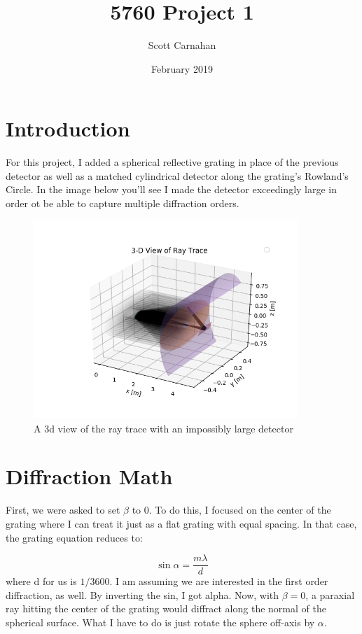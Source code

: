 \documentclass{article}
\title{5760 Project 1}
\author{Scott Carnahan}
\date{February 2019}
\begin{document}
\maketitle
\tableofcontents

\section{Introduction}
For this project, I added a spherical reflective grating in place of the previous detector as well as a matched cylindrical detector along the grating's Rowland's Circle.  In the image below you'll see I made the detector exceedingly large in order ot be able to capture multiple diffraction orders.

\begin{figure}[H]
    \centering
    \includegraphics[width=10cm]{figures/lab_view.png}
    \caption{A 3d view of the ray trace with an impossibly large detector}
    \label{}



\end{figure}

\section{Diffraction Math}
First, we were asked to set $\beta$ to $0$. To do this, I focused on the center of the grating where I can treat it just as a flat grating with equal spacing. In that case, the grating equation reduces to:

\begin{equation}
    \sin{\alpha} = \frac{m \lambda}{d}
\end{equation}
where d for us is $1 / 3600$. I am assuming we are interested in the first order diffraction, as well. By inverting the sin, I got alpha. Now, with $\beta = 0$, a paraxial ray hitting the center of the grating would diffract along the normal of the spherical surface.  What I have to do is just rotate the sphere off-axis by $\alpha$.
\end{document}
